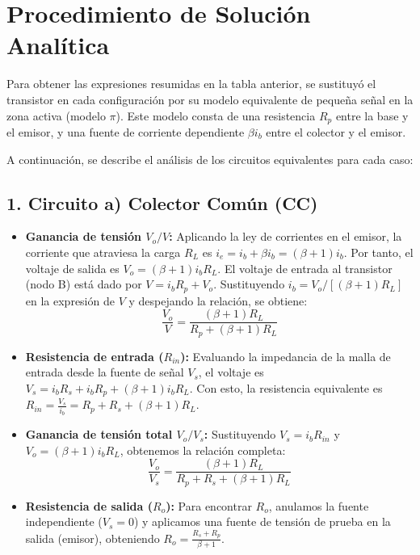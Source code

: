 \documentclass[12pt, a4paper]{article}
\begin{document}
\vspace{1cm}
\section*{Procedimiento de Solución Analítica}

Para obtener las expresiones resumidas en la tabla anterior, se sustituyó el transistor en cada configuración por su modelo equivalente de pequeña señal en la zona activa (modelo $\pi$). Este modelo consta de una resistencia $R_p$ entre la base y el emisor, y una fuente de corriente dependiente $\beta i_b$ entre el colector y el emisor.

A continuación, se describe el análisis de los circuitos equivalentes para cada caso:

\subsection*{1. Circuito a) Colector Común (CC)}
\begin{itemize}
    \item \textbf{Ganancia de tensión $V_o/V$:} Aplicando la ley de corrientes en el emisor, la corriente que atraviesa la carga $R_L$ es $i_e = i_b + \beta i_b = (\beta + 1)i_b$. Por tanto, el voltaje de salida es $V_o = (\beta + 1)i_b R_L$. El voltaje de entrada al transistor (nodo B) está dado por $V = i_b R_p + V_o$. Sustituyendo $i_b = V_o / [(\beta + 1)R_L]$ en la expresión de $V$ y despejando la relación, se obtiene:
    \[ \frac{V_o}{V} = \frac{(\beta + 1)R_L}{R_p + (\beta + 1)R_L} \]
    \item \textbf{Resistencia de entrada ($R_{in}$):} Evaluando la impedancia de la malla de entrada desde la fuente de señal $V_s$, el voltaje es $V_s = i_b R_s + i_b R_p + (\beta+1)i_b R_L$. Con esto, la resistencia equivalente es $R_{in} = \frac{V_s}{i_b} = R_p + R_s + (\beta + 1)R_L$.
    \item \textbf{Ganancia de tensión total $V_o/V_s$:} Sustituyendo $V_s = i_b R_{in}$ y $V_o = (\beta + 1)i_b R_L$, obtenemos la relación completa:
    \[ \frac{V_o}{V_s} = \frac{(\beta + 1)R_L}{R_p + R_s + (\beta + 1)R_L} \]
    \item \textbf{Resistencia de salida ($R_o$):} Para encontrar $R_o$, anulamos la fuente independiente ($V_s = 0$) y aplicamos una fuente de tensión de prueba en la salida (emisor), obteniendo $R_o = \frac{R_s + R_p}{\beta + 1}$.
\end{itemize}
\end{document}
